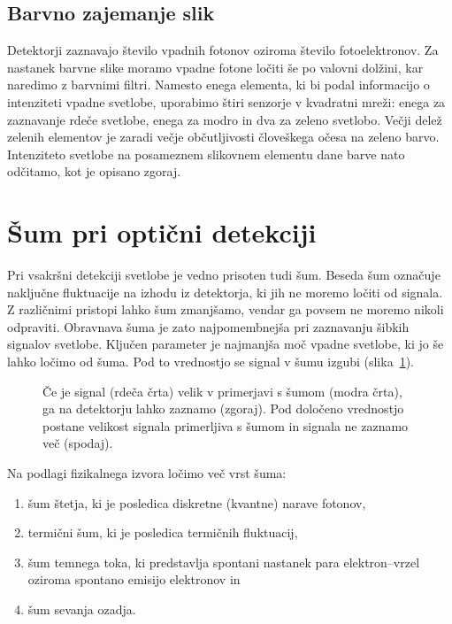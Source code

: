 \subsection*{Barvno zajemanje slik}
Detektorji zaznavajo število vpadnih fotonov oziroma število fotoelektronov.
Za nastanek barvne slike moramo vpadne fotone ločiti še po valovni dolžini, kar naredimo
z barvnimi filtri. Namesto enega elementa, ki bi podal informacijo o intenziteti vpadne 
svetlobe, uporabimo štiri senzorje v kvadratni mreži: enega za zaznavanje rdeče svetlobe,
enega za modro in dva za zeleno svetlobo.
Večji delež zelenih elementov je zaradi večje občutljivosti človeškega očesa na zeleno barvo. 
Intenziteto svetlobe na posameznem slikovnem elementu dane barve nato odčitamo, kot je
opisano zgoraj.
 
\section{Šum pri optični detekciji}
\label{chap:sum}
Pri vsakršni detekciji svetlobe je vedno prisoten tudi šum. Beseda šum označuje naključne 
fluktuacije na izhodu iz detektorja, ki jih ne moremo ločiti od signala. Z različnimi 
pristopi lahko šum zmanjšamo, vendar ga povsem ne moremo nikoli odpraviti. Obravnava 
šuma je zato najpomembnejša pri zaznavanju šibkih signalov svetlobe. Ključen
parameter je najmanjša moč vpadne svetlobe, ki jo še lahko ločimo od šuma. Pod to vrednostjo 
se signal v šumu izgubi (slika~\ref{11_sum}).
\begin{figure}[ht]
\centering
\def\svgwidth{140truemm} 

\caption{Če je signal (rdeča črta) velik v primerjavi s šumom (modra črta), 
ga na detektorju lahko zaznamo (zgoraj). 
Pod določeno vrednostjo postane velikost signala primerljiva s šumom in signala ne zaznamo več
(spodaj).}
\label{11_sum}
\end{figure}

Na podlagi fizikalnega izvora ločimo več vrst šuma:
\begin{enumerate}
\item šum štetja, ki je posledica diskretne (kvantne) narave fotonov,
\item termični šum, ki je posledica termičnih fluktuacij,
\item šum temnega toka, ki predstavlja spontani nastanek para elektron--vrzel oziroma spontano
emisijo elektronov in
\item šum sevanja ozadja.
\end{enumerate}

